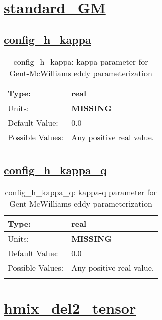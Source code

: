 \section[standard\_GM]{\hyperref[sec:nm_tab_standard_GM]{standard\_GM}}
\label{sec:nm_sec_standard_GM}
\subsection[config\_h\_kappa]{\hyperref[sec:nm_tab_standard_GM]{config\_h\_kappa}}
\label{subsec:nm_sec_config_h_kappa}
\begin{center}
\begin{longtable}{| p{2.0in} | p{4.0in} |}
    \hline
    Type: & real \\
    \hline
    Units: & {\bf \color{red} MISSING} \\
    \hline
    Default Value: & 0.0 \\
    \hline
    Possible Values: & Any positive real value. \\
    \hline
    \caption{config\_h\_kappa: kappa parameter for Gent-McWilliams eddy parameterization}
\end{longtable}
\end{center}
\subsection[config\_h\_kappa\_q]{\hyperref[sec:nm_tab_standard_GM]{config\_h\_kappa\_q}}
\label{subsec:nm_sec_config_h_kappa_q}
\begin{center}
\begin{longtable}{| p{2.0in} | p{4.0in} |}
    \hline
    Type: & real \\
    \hline
    Units: & {\bf \color{red} MISSING} \\
    \hline
    Default Value: & 0.0 \\
    \hline
    Possible Values: & Any positive real value. \\
    \hline
    \caption{config\_h\_kappa\_q: kappa-q parameter for Gent-McWilliams eddy parameterization}
\end{longtable}
\end{center}
\section[hmix\_del2\_tensor]{\hyperref[sec:nm_tab_hmix_del2_tensor]{hmix\_del2\_tensor}}
\label{sec:nm_sec_hmix_del2_tensor}
